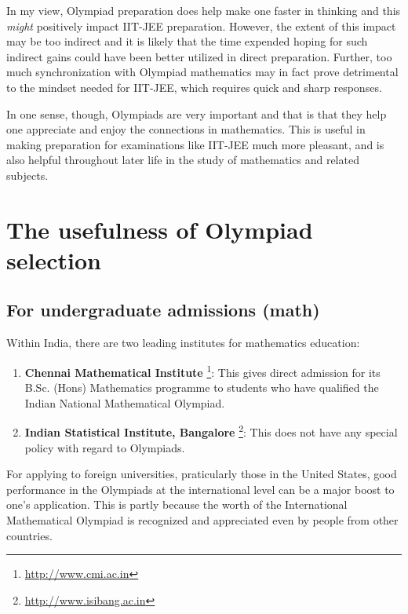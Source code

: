 \documentclass[a4paper]{amsart}
\begin{document}
In my view, Olympiad preparation does help make one faster in thinking
and this {\em might} positively impact IIT-JEE preparation. However,
the extent of this impact may be too indirect and it is likely that
the time expended hoping for such indirect gains could have been
better utilized in direct preparation. Further, too much synchronization
with Olympiad mathematics may in fact prove detrimental to the mindset
needed for IIT-JEE, which requires quick and sharp responses.

In one sense, though, Olympiads are very important and that is that
they help one appreciate and enjoy the connections in mathematics.
This is useful in making preparation for examinations like IIT-JEE
much more pleasant, and is also helpful throughout later life in the
study of mathematics and related subjects.

\section{The usefulness of Olympiad selection}

\subsection{For undergraduate admissions (math)}

Within India, there are two leading institutes for mathematics
education:

\begin{enumerate}

\item {\bf Chennai Mathematical Institute}
  \footnote{\url{http://www.cmi.ac.in}}: This gives direct admission
  for its B.Sc. (Hons) Mathematics programme to students who
  have qualified the Indian National Mathematical Olympiad.

\item {\bf Indian Statistical Institute, Bangalore}
  \footnote{\url{http://www.isibang.ac.in}}: This does not have any special
  policy with regard to Olympiads.

\end{enumerate}

For applying to foreign universities, praticularly those in the United
States, good performance in the Olympiads at the international level
can be a major boost to one's application. This is partly because the worth
of the International Mathematical Olympiad is recognized and appreciated
even by people from other countries.
\end{document}
